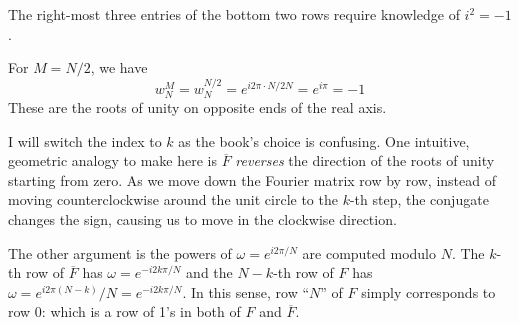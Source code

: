 \documentclass[a4paper]{article}
\begin{document}
The right-most three entries of the bottom two rows require knowledge of \( i^{2} = -1 \).

For \( M = N / 2 \), we have
\[
	w^{M}_{N} = w^{N / 2}_{N} = e^{i 2 \pi \cdot N / 2N} = e^{i \pi} = -1
\]
These are the roots of unity on opposite ends of the real axis.

\vspace{12pt}


I will switch the index to \( k \) as the book's choice is confusing. One intuitive, geometric analogy to make here is \( \overline{F} \) \textit{reverses} the direction of the roots of unity starting from zero. As we move down the Fourier matrix row by row, instead of moving counterclockwise around the unit circle to the \( k \)-th step, the conjugate changes the sign, causing us to move in the clockwise direction.

The other argument is the powers of \( \omega = e^{i 2 \pi / N} \) are computed modulo \( N \).
The \( k \)-th row of \( \overline{F} \) has \( \omega = e^{-i 2k \pi / N} \) and the \( N - k \)-th row of \( F \) has \( \omega = e^{i 2 \pi \!\left( N - k \right)} / N = e^{-i 2k \pi / N} \). In this sense, row ``\( N \)'' of \( F \) simply corresponds to row 0: which is a row of 1's in both of \( F \) and \( \overline{F} \).

\vspace{12pt}

\end{document}
